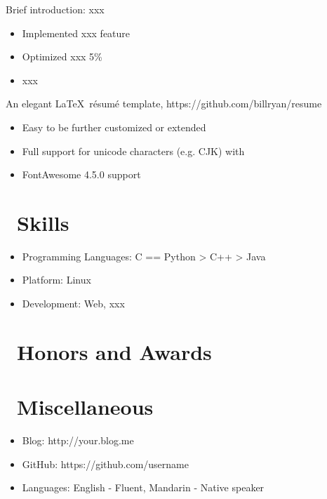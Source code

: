 \documentclass{resume}
\begin{document}
Brief introduction: xxx
\begin{itemize}
  \item Implemented xxx feature
  \item Optimized xxx 5\%
  \item xxx
\end{itemize}

An elegant \LaTeX\ résumé template, https://github.com/billryan/resume
\begin{itemize}
  \item Easy to be further customized or extended
  \item Full support for unicode characters (e.g. CJK) with \XeLaTeX\
  \item FontAwesome 4.5.0 support
\end{itemize}


\section{\faCogs\ Skills}
\begin{itemize}[parsep=0.5ex]
  \item Programming Languages: C == Python > C++ > Java
  \item Platform: Linux
  \item Development: Web, xxx
\end{itemize}

\section{\faHeartO\ Honors and Awards}

\section{\faInfo\ Miscellaneous}
\begin{itemize}[parsep=0.5ex]
  \item Blog: http://your.blog.me
  \item GitHub: https://github.com/username
  \item Languages: English - Fluent, Mandarin - Native speaker
\end{itemize}

%
%
\end{document}
